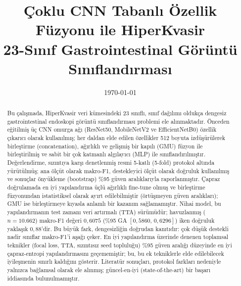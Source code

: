 \documentclass[11pt,a4paper]{article}
\title{Çoklu CNN Tabanlı Özellik Füzyonu ile HiperKvasir\\
       23-Sınıf Gastrointestinal Görüntü Sınıflandırması}
\author{\TODO{Öğrenci 1 Ad Soyad, No} \and \TODO{Öğrenci 2 Ad Soyad, No}}
\date{\today}
\begin{document}
\maketitle

\begin{abstract}
Bu çalışmada, HiperKvasir veri kümesindeki 23 sınıflı, sınıf dağılımı oldukça
dengesiz gastrointestinal endoskopi görüntü sınıflandırması problemi ele
alınmaktadır. Önceden eğitilmiş üç CNN omurga ağı (ResNet50, MobileNetV2 ve
EfficientNetB0) özellik çıkarıcı olarak kullanılmış; her daldan elde edilen
özellikler 512 boyuta izdüşürülerek birleştirme (concatenation), ağırlıklı ve
gelişmiş bir kapılı (GMU) füzyon ile birleştirilmiş ve sabit bir çok katmanlı
algılayıcı (MLP) ile sınıflandırılmıştır. Değerlendirme, sızıntıya karşı
denetlenmiş resmi 5-katlı (5-fold) protokol altında yürütülmüş; ana ölçüt olarak
makro-F1, destekleyici ölçüt olarak doğruluk kullanılmış ve sonuçlar önyükleme
(bootstrap) \%95 güven aralıklarıyla raporlanmıştır. Çapraz doğrulamada en iyi
yapılandırma üçlü ağırlıklı fine-tune olmuş ve birleştirme füzyonundan
istatistiksel olarak ayırt edilebilmiştir (örtüşmeyen güven aralıkları); GMU ise
birleştirmeye kıyasla anlamlı bir kazanım sağlamamıştır. Nihai model, bu
yapılandırmanın test zamanı veri artırmalı (TTA) sürümüdür; havuzlanmış
($n=10{.}662$) makro-F1 değeri $0{,}6075$ (\%95 GA $[0{,}5860,\,0{,}6296]$) iken
doğruluk yaklaşık $0{,}88$'dir. Bu büyük fark, dengesizliğin doğrudan kanıtıdır:
çok düşük destekli nadir sınıflar makro-F1'i aşağı çeker. En iyi yapılandırma
üzerinde denenen toplamsal teknikler (focal loss, TTA, sızıntısız seed
topluluğu) \%95 güven aralığı düzeyinde en iyi çapraz-entropi yapılandırmasını
geçememiştir; bu, bu ek tekniklerle elde edilebilecek iyileşmenin sınırlı
kaldığını gösterir.
Literatür sonuçları, protokol farkları nedeniyle yalnızca bağlamsal olarak ele
alınmış; güncel-en-iyi (state-of-the-art) bir başarı iddiasında
bulunulmamıştır.
\end{abstract}











\end{document}
